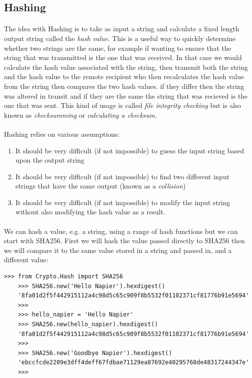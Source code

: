 \documentclass[12pt, a4paper, oneside]{book}
\begin{document}
\subsection{Hashing}
\paragraph{} The idea with Hashing is to take as input a string and calculate a fixed length output string called the \emph{hash value}. This is a useful way to quickly determine whether two strings are the same, for example if wanting to ensure that the string that was transmitted is the one that was received. In that case we would calculate the hash value associated with the string, then transmit both the string and the hash value to the remote recipient who then recalculates the hash value from the string then compares the two hash values. if they differ then the string was altered in transit and if they are the same the string that was recieved is the one that was sent. This kind of usage is called \emph{file integrity checking} but is also known as \emph{checksumming} or \emph{calculating a checksum}.

\paragraph{} Hashing relies on various assumptions:

\begin{enumerate}
\item It should be very difficult (if not impossible) to guess the input string based upon the output string
\item It should be very difficult (if not impossible) to find two different input strings that have the same output (known as a \emph{collision})
\item It should be very difficult (if not impossible) to modify the input string without also modifying the hash value as a result.
\end{enumerate}

\paragraph{} We can hash a value, e.g. a string, using a range of hash functions but we can start with SHA256. First we will hash the value passed directly to SHA256 then we will compare it to the same value stored in a string and passed in, and a different value:

\begin{lstlisting}[style=DOS]
    >>> from Crypto.Hash import SHA256
    >>> SHA256.new('Hello Napier').hexdigest()
    '8fa01d2f5f442915112a4c98d5c65c909f8b5532f01102371cf81776b91e5694'
    >>>
    >>> hello_napier = 'Hello Napier'
    >>> SHA256.new(hello_napier).hexdigest()
    '8fa01d2f5f442915112a4c98d5c65c909f8b5532f01102371cf81776b91e5694'
    >>> 
    >>> SHA256.new('Goodbye Napier').hexdigest()
    'ebccfcde2209e3dff4deff67fdbae71129ea87692e40295768de48317244347e'
    >>>
\end{lstlisting}
\end{document}
